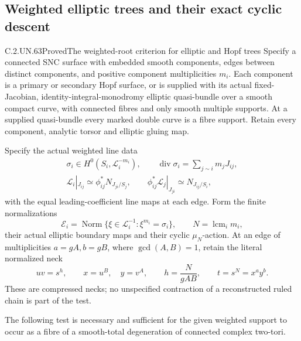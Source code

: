 \subsection{Weighted elliptic trees and their exact cyclic descent}

\begin{statement}{C.2.UN.63}{Proved}{The weighted-root criterion for elliptic and Hopf trees}
Specify a connected SNC surface with embedded smooth components,
edges between distinct components, and positive component
multiplicities \(m_i\). Each component is a primary or secondary
Hopf surface, or is supplied with its actual fixed-Jacobian,
identity-integral-monodromy elliptic quasi-bundle over a smooth
compact curve, with connected fibres and only smooth multiple
supports. At a supplied quasi-bundle every marked double curve
is a fibre support. Retain every component, analytic torsor and
elliptic gluing map.

Specify the actual weighted line data
\[
 \begin{gathered}
 \sigma_i\in H^0(S_i,\mathcal L_i^{-m_i}),\qquad
 \operatorname{div}\sigma_i=\sum_{j\sim i}m_jJ_{ij},\\
 \mathcal L_i|_{J_{ij}}\simeq
       \phi_{ij}^{*}N_{J_{ji}/S_j},\qquad
 \phi_{ij}^{*}\mathcal L_j|_{J_{ji}}
       \simeq N_{J_{ij}/S_i},
 \end{gathered}
 \tag{C.WT.1}
\]
with the equal leading-coefficient line maps at each edge.
Form the finite normalizations
\[
 \mathcal E_i=\operatorname{Norm}
       \{\xi\in\mathcal L_i^{-1}:\xi^{m_i}=\sigma_i\},
 \qquad N=\operatorname{lcm}_i m_i,
 \tag{C.WT.2}
\]
their actual elliptic boundary maps and their cyclic
\(\mu_N\)-action. At an edge of multiplicities \(a=gA,b=gB\),
where \(\gcd(A,B)=1\), retain the literal normalized neck
\[
       uv=s^h,\qquad x=u^B,\quad y=v^A,\qquad
       h=\frac{N}{gAB},\qquad t=s^N=x^a y^b.
 \tag{C.WT.3}
\]
These are compressed necks; no unspecified contraction of a
reconstructed ruled chain is part of the test.

The following test is necessary and sufficient for the given
weighted support to occur as a fibre of a smooth-total
degeneration of connected complex two-tori.


\end{statement}
